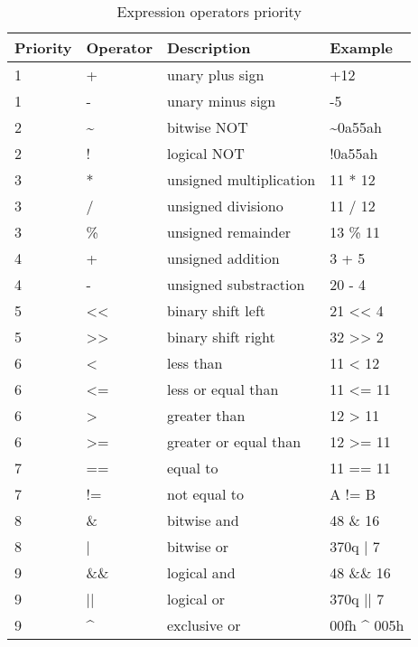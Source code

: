     \begin{table}[h!]
        \centering{}
        \mysmallfont{}

        \begin{tabular}{|l|l|l|l|}
            \hline
            Priority & Operator & Description             & Example         \\\hline
            1        & +        & unary plus sign         & +12             \\\hline
            1        & -        & unary minus sign        & -5              \\\hline
            2        & \~{}     & bitwise NOT             & \~{}0a55ah      \\\hline
            2        & !        & logical NOT             & !0a55ah         \\\hline
            3        & *        & unsigned multiplication & 11 * 12         \\\hline
            3        & /        & unsigned divisiono      & 11 / 12         \\\hline
            3        & \%       & unsigned remainder      & 13 \% 11        \\\hline
            4        & +        & unsigned addition       & 3 + 5           \\\hline
            4        & -        & unsigned substraction   & 20 - 4          \\\hline
            5        & <{}<     & binary shift left       & 21 << 4         \\\hline
            5        & >{}>     & binary shift right      & 32 >> 2         \\\hline
            6        & <        & less than               & 11 < 12         \\\hline
            6        & <=       & less or equal than      & 11 <= 11        \\\hline
            6        &  >       & greater than            & 12 > 11         \\\hline
            6        & >=       & greater or equal than   & 12 >= 11        \\\hline
            7        & ==       & equal to                & 11 == 11        \\\hline
            7        & !=       & not equal to            &  A != B         \\\hline
            8        & \&       & bitwise and             & 48 \& 16        \\\hline
            8        & |        & bitwise or              & 370q | 7        \\\hline
            9        & \&\&     & logical and             & 48 \&\& 16      \\\hline
            9        & ||       & logical or              & 370q || 7       \\\hline
            9        & \^{}     & exclusive or            & 00fh \^{} 005h  \\\hline
        \end{tabular}

        \caption{Expression operators priority}
    \end{table}

